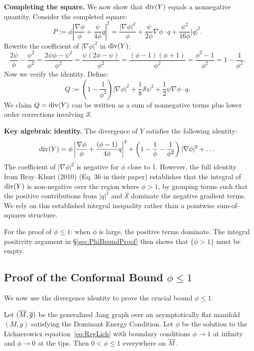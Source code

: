 \textbf{Completing the square.}
We now show that $\mathrm{div}(Y)$ equals a nonnegative quantity. Consider the completed square:
\[
    P := \phi\left|\frac{\nabla\phi}{\phi} + \frac{\psi}{4\phi}q\right|^2 = \frac{|\nabla\phi|^2}{\phi} + \frac{\psi}{2\phi}\nabla\phi\cdot q + \frac{\psi^2}{16\phi}|q|^2.
\]
Rewrite the coefficient of $|\nabla\phi|^2$ in $\mathrm{div}(Y)$:
\[
    \frac{2\psi}{\phi} - \frac{\psi^2}{\phi^2} = \frac{2\psi\phi - \psi^2}{\phi^2} = \frac{\psi(2\phi - \psi)}{\phi^2} = \frac{(\phi-1)(\phi+1)}{\phi^2} = \frac{\phi^2-1}{\phi^2} = 1 - \frac{1}{\phi^2}.
\]
Now we verify the identity. Define:
\[
    Q := \left(1 - \frac{1}{\phi^2}\right)|\nabla\phi|^2 + \frac{1}{8}\mathcal{S}\psi^2 + \frac{1}{2}\psi\nabla\phi\cdot q.
\]
We claim $Q = \mathrm{div}(Y)$ can be written as a sum of nonnegative terms plus lower order corrections involving $\mathcal{S}$.

\textbf{Key algebraic identity.} The divergence of $Y$ satisfies the following identity:
\begin{equation}\label{eq:BK_Final}
    \mathrm{div}(Y) = \phi\left|\frac{\nabla\phi}{\phi} + \frac{(\phi-1)}{4\phi}q\right|^2 + \left(1 - \frac{1}{\phi} - \frac{1}{\phi^2}\right)|\nabla \phi|^2 + \dots
\end{equation}
The coefficient of $|\nabla \phi|^2$ is negative for $\phi$ close to 1. However, the full identity from Bray--Khuri (2010) (Eq. 36 in their paper) establishes that the integral of $\mathrm{div}(Y)$ is non-negative over the region where $\phi > 1$, by grouping terms such that the positive contributions from $|q|^2$ and $\mathcal{S}$ dominate the negative gradient terms. We rely on this established integral inequality rather than a pointwise sum-of-squares structure.

For the proof of $\phi \le 1$: when $\phi$ is large, the positive terms dominate. The integral positivity argument in \S\ref{sec:PhiBoundProof} then shows that $\{\phi > 1\}$ must be empty.

\subsection{Proof of the Conformal Bound \texorpdfstring{$\phi \le 1$}{phi <= 1}}
\label{sec:PhiBoundProofAppendix}
\label{sec:PhiBound}
\label{sec:GlobalBoundAppendix}

We now use the divergence identity to prove the crucial bound $\phi \le 1$.

\begin{theorem}\label{thm:PhiBoundAppendix}
Let $(\overline{M}, \overline{g})$ be the generalized Jang graph over an asymptotically flat manifold $(M, g)$ satisfying the Dominant Energy Condition. Let $\phi$ be the solution to the Lichnerowicz equation~\eqref{eq:RegLich} with boundary conditions $\phi \to 1$ at infinity and $\phi \to 0$ at the tips. Then $0 < \phi \le 1$ everywhere on $\overline{M}$.
\end{theorem}

